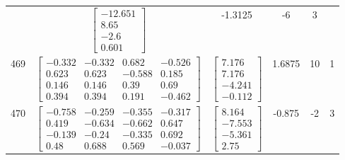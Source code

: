 \documentclass[a4paper,12pt]{article}
\begin{document}
\begin{tabular}{c c c c c c}
&
$\begin{bmatrix} -12.651 \\ 8.65 \\ -2.6 \\ 0.601 \end{bmatrix}$
&
-1.3125
&
-6
&
3
\\
469
&
$\begin{bmatrix} -0.332 & -0.332 & 0.682 & -0.526 \\ 0.623 & 0.623 & -0.588 & 0.185 \\ 0.146 & 0.146 & 0.39 & 0.69 \\ 0.394 & 0.394 & 0.191 & -0.462 \end{bmatrix}$
&
$\begin{bmatrix} 7.176 \\ 7.176 \\ -4.241 \\ -0.112 \end{bmatrix}$
&
1.6875
&
10
&
1
\\
470
&
$\begin{bmatrix} -0.758 & -0.259 & -0.355 & -0.317 \\ 0.419 & -0.634 & -0.662 & 0.647 \\ -0.139 & -0.24 & -0.335 & 0.692 \\ 0.48 & 0.688 & 0.569 & -0.037 \end{bmatrix}$
&
$\begin{bmatrix} 8.164 \\ -7.553 \\ -5.361 \\ 2.75 \end{bmatrix}$
&
-0.875
&
-2
&
3
\\
\end{tabular} \egroup \newpage
\end{document}
